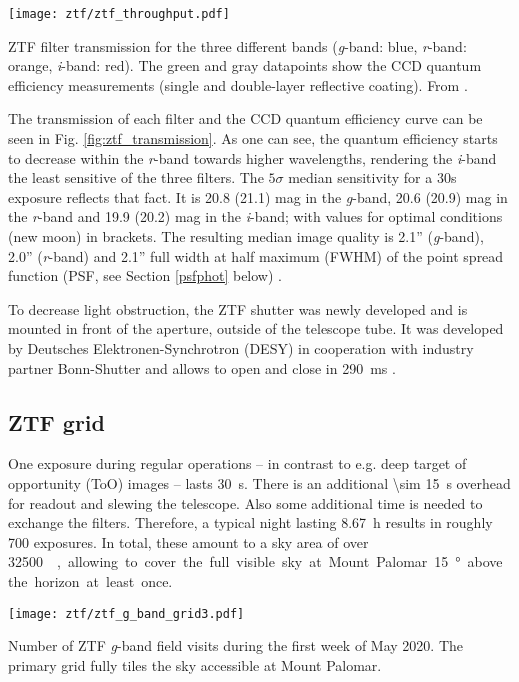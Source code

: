 \begin{marginfigure}
    \texttt{[image: ztf/ztf\_throughput.pdf]}
    \caption[ZTF filter transmission]{ZTF filter transmission for the three different bands (\textit{g}-band: blue, \textit{r}-band: orange, \textit{i}-band: red). The green and gray datapoints show the CCD quantum efficiency measurements (single and double-layer reflective coating). From \cite{Bellm2019}.}
\end{marginfigure}

The transmission of each filter and the CCD quantum efficiency curve can be seen in Fig. \ref{fig:ztf_transmission}. As one can see, the quantum efficiency starts to decrease within the \textit{r}-band towards higher wavelengths, rendering the \textit{i}-band the least sensitive of the three filters. The $5\sigma$ median sensitivity for a 30s exposure reflects that fact. It is 20.8 (21.1) mag in the \textit{g}-band, 20.6 (20.9) mag in the \textit{r}-band and 19.9 (20.2) mag in the \textit{i}-band; with values for optimal conditions (new moon) in brackets. The resulting median image quality is 2.1'' (\textit{g}-band), 2.0'' (\textit{r}-band) and 2.1'' full width at half maximum (FWHM) of the point spread function (PSF, see Section \ref{psfphot} below) \cite{Bellm2019}.

To decrease light obstruction, the ZTF shutter was newly developed and is mounted in front of the aperture, outside of the telescope tube. It was developed by Deutsches Elektronen-Synchrotron (DESY) in cooperation with industry partner Bonn-Shutter and allows to open and close in \SI{290}{\milli \second} \cite{Dekany2020}.

\subsection{ZTF grid} \label{ztf_grid}
One exposure during regular operations -- in contrast to e.g. deep target of opportunity (ToO) images -- lasts \SI{30}{\second}. There is an additional \SI{\sim 15}{\second} overhead for readout and slewing the telescope. Also some additional time is needed to exchange the filters. Therefore, a typical night lasting \SI{8.67}{\hour}  results in roughly 700 exposures. In total, these amount to a sky area of over \SI{32500}{\square\deg}, allowing to cover the full visible sky at Mount Palomar \SI{15}{\degree} above the horizon at least once.

\begin{marginfigure}
    \texttt{[image: ztf/ztf\_g\_band\_grid3.pdf]}
    \caption[ZTF field visits]{Number of ZTF \textit{g}-band field visits during the first week of May 2020. The primary grid fully tiles the sky accessible at Mount Palomar.}
\end{marginfigure}

